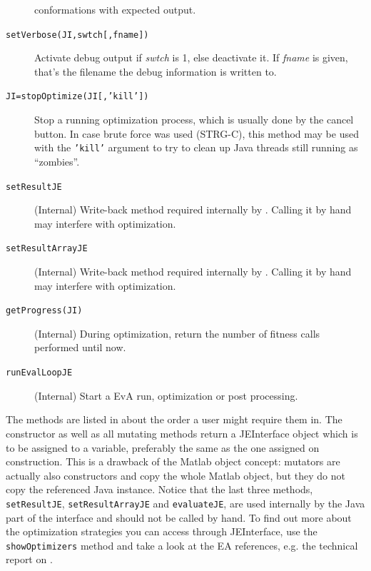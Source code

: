 \begin{description}
conformations with expected output.
\item [{\texttt{setVerbose(JI,swtch{[},fname{]})}}] Activate debug output
if \emph{swtch} is 1, else deactivate it. If \emph{fname} is given,
that's the filename the debug information is written to.
\item [{\texttt{JI=stopOptimize(JI{[},'kill'{]})}}] Stop a running optimization
process, which is usually done by the cancel button. In case brute
force was used (STRG-C), this method may be used with the \texttt{'kill'}
argument to try to clean up Java threads still running as ``zombies''.
\item [{\texttt{setResultJE}}] (Internal) Write-back method required internally
by . Calling it by hand may interfere with optimization.
\item [{\texttt{setResultArrayJE}}] (Internal) Write-back method required
internally by . Calling it by hand may interfere with optimization.
\item [{\texttt{getProgress(JI)}}] (Internal) During optimization, return
the number of fitness calls performed until now.
\item [{\texttt{runEvalLoopJE}}] (Internal) Start a EvA run, optimization
or post processing.
\end{description}
The methods are listed in about the order a user might require them
in. The constructor as well as all mutating methods return a JEInterface
object which is to be assigned to a variable, preferably the same
as the one assigned on construction. This is a drawback of the Matlab
object concept: mutators are actually also constructors and copy the
whole Matlab object, but they do not copy the referenced Java instance.
Notice that the last three methods, \texttt{setResultJE}, \texttt{setResultArrayJE}
and \texttt{evaluateJE}, are used internally by the Java part of the
interface and should not be called by hand. To find out more about
the optimization strategies you can access through JEInterface, use
the \texttt{showOptimizers} method and take a look at the EA references,
e.g. the technical report on  \cite{JOptDocumentation}. 

